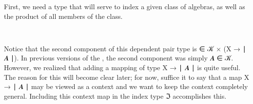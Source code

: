 \documentclass[a4paper,UKenglish,cleveref,autoref,thm-restate,11pt]{lipics-v2021}
\begin{document}
First, we need a type that will serve to index a given class of algebras, as well as the product of all members of the class.
\ccpad
\begin{code}%
\>[1]\AgdaSpace{}%
\AgdaSymbol{:}\AgdaSpace{}%
\AgdaSpace{}%
\AgdaSymbol{(}\AgdaSpace{}%
\AgdaSpace{}%
\AgdaSymbol{)(}\AgdaSpace{}%
\AgdaSymbol{)}\AgdaSpace{}%
\AgdaSpace{}%
\AgdaSymbol{(}\AgdaSpace{}%
\AgdaSpace{}%
\AgdaSpace{}%
\AgdaSymbol{)}%
\<%
\\
%
\>[1]\AgdaSpace{}%
\AgdaSpace{}%
\AgdaSymbol{=}\AgdaSpace{}%
\AgdaSpace{}%
\AgdaSpace{}%
\AgdaSpace{}%
\AgdaSymbol{(}\AgdaSpace{}%
\AgdaSpace{}%
\AgdaSymbol{)}\AgdaSpace{}%
\AgdaFunction{,}\AgdaSpace{}%
\AgdaSymbol{(}\AgdaSpace{}%
\AgdaSpace{}%
\AgdaSymbol{)}\AgdaSpace{}%
\AgdaSpace{}%
\AgdaSymbol{(}\AgdaSpace{}%
\AgdaSpace{}%
\AgdaSpace{}%
\AgdaSpace{}%
\AgdaSymbol{)}\<%
\end{code}
\ccpad
Notice that the second component of this dependent pair type is  \af ∈ \ab 𝒦 \ad × (\ab X \as → \af ∣ \ab 𝑨 \af ∣). In previous versions of the \ualib, the second component was simply \ab 𝑨 \af ∈ \ab 𝒦. However, we realized that adding a mapping of type \ab X \as → \af ∣ \ab 𝑨 \af ∣ is quite useful. The reason for this will become clear later; for now, suffice it to say that a map \ab X \as → \af ∣ \ab 𝑨 \af ∣ may be viewed as a context and we want to keep the context completely general. Including this context map in the index type \af ℑ accomplishes this.
\end{document}
